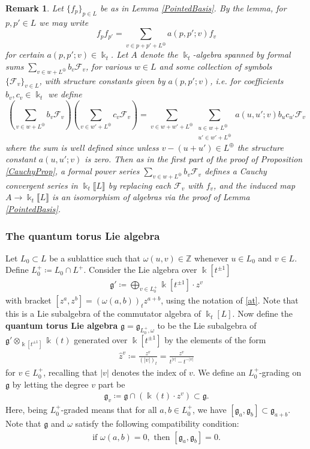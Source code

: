 \documentclass{amsart}
\let\llb=\llbracket
\let\rrb=\rrbracket
\let\bb=\mathbb
\let\f=\mathfrak
\newcommand {\kk} {\Bbbk}
\theoremstyle{plain}%
\newtheorem{rem}[thm]{Remark}
\theoremstyle{definition}
\theoremstyle{remark}
\begin{document}
\begin{rem}\label{formal_mult}
Let $\{f_p\}_{p\in L}$ be as in Lemma \ref{PointedBasis}.  By the lemma, for $p,p'\in L$ we may write 
\[
f_pf_{p'}=\sum_{v\in p+p'+L^{\oplus}}a(p,p';v)f_v
\]
for certain $a(p,p';v)\in \kk_t$.  Let $A$ denote the $\kk_t$-algebra spanned by formal sums $\sum_{v\in w+L^{\oplus}}b_v\mathscr{F}_v$, for various $w\in L$ and some collection of symbols $\{\mathscr{F}_v\}_{v\in L}$, with structure constants given by $a(p,p';v)$, i.e. for coefficients $b_v,c_v\in \kk_t$ we define
\[
\left(\sum_{v\in w+L^{\oplus}}b_v\mathscr{F}_v \right)\left( \sum_{v\in w'+L^{\oplus}}c_v\mathscr{F}_v\right)=\sum_{v\in w+w'+L^{\oplus}}\sum_{\substack{u\in w+L^{\oplus}\\u'\in w'+L^{\oplus}}}a(u,u';v)b_u c_{u'}\mathscr{F}_{v}
\]
where the sum is well defined since unless $v-(u+u')\in L^{\oplus}$ the structure constant $a(u,u';v)$ is zero.  Then as in the first part of the proof of Proposition \ref{CauchyProp}, a formal power series $\sum_{v\in w+L^{\oplus}}b_v\mathscr{F}_v$ defines a Cauchy convergent series in $\kk_t\llb L\rrb$ by replacing each $\mathscr{F}_v$ with $f_v$, and the induced map $A\rightarrow\kk_t\llb L\rrb$ is an isomorphism of algebras via the proof of Lemma \ref{PointedBasis}.  
\end{rem}


\subsubsection{The quantum torus Lie algebra}\label{qTorLie}

Let $L_0\subset L$ be a sublattice such that $\omega(u,v)\in \bb{Z}$ whenever $u\in L_0$ and $v\in L$.  Define $L_0^+\coloneqq L_0\cap L^+$. 
Consider the Lie algebra over $\kk[t^{\pm 1}]$
\begin{align*}
    \f{g}'\coloneqq \bigoplus_{v\in L_0^+} \kk[t^{\pm 1}]\cdot z^v
\end{align*}
with bracket $[z^a,z^b]=(\omega(a,b))_t z^{a+b}$, using the notation of \eqref{at}.  Note that this is a Lie subalgebra of the commutator algebra of $\kk_t[L]$.  Now define the \textbf{quantum torus Lie algebra} $\f{g}=\f{g}_{L_0^+,\omega}$ to be the Lie subalgebra of $\f{g}'\otimes_{\kk[t^{\pm 1}]} \kk(t)$ generated over $\kk[t^{\pm 1}]$ by the elements of the form 
\begin{align}\label{hatz}
    \hat{z}^v\coloneqq \frac{z^v}{(|v|)_{t}}=\frac{z^v}{t^{|v|}-t^{-|v|}}
\end{align} 
for $v\in L_0^+$, recalling that $|v|$ denotes the index of $v$.  We define an $L_0^+$-grading on $\f{g}$ by letting the degree $v$ part be
\begin{align*}
    \f{g}_v\coloneqq \f{g}\cap (\kk(t)\cdot z^v) \subset \f{g}.
\end{align*}
Here, being $L_0^+$-graded means that for all $a,b\in L_0^+$, we have $[\f{g}_a,\f{g}_b]\subset \f{g}_{a+b}$.  
Note that $\f{g}$ and $\omega$ satisfy the following compatibility condition:
\begin{align}\label{skewCondition}
\mbox{if~}\omega(a,b)=0, \mbox{~then~} [\f{g}_{a},\f{g}_{b}]=0.    
\end{align}
\end{document}
